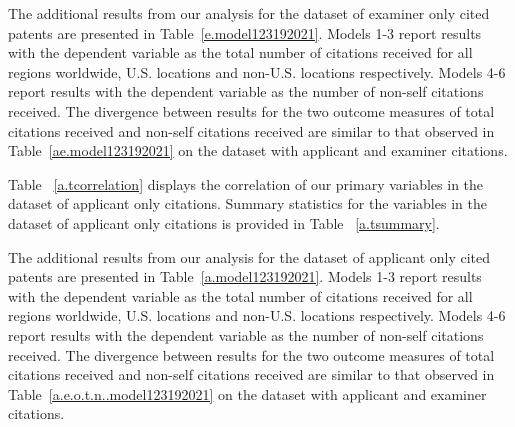\documentclass[12pt,letterpaper]{article}
\begin{document}

%

The additional results from our analysis for the dataset of examiner only cited patents are presented in Table~\ref{e.model123192021}. Models 1-3 report results with the dependent variable as the total number of citations received for all regions worldwide, U.S. locations and non-U.S. locations respectively. Models 4-6 report results with the dependent variable as the number of non-self citations received. The divergence between results for the two outcome measures of total citations received and non-self citations received are similar to that observed in Table~\ref{ae.model123192021} on the dataset with applicant and examiner citations. \par





Table ~\ref{a.tcorrelation} displays the correlation of our primary variables in the dataset of applicant only citations. Summary statistics for the variables in the dataset of applicant only citations is provided in Table ~\ref{a.tsummary}.


%



%

The additional results from our analysis for the dataset of applicant only cited patents are presented in Table~\ref{a.model123192021}. Models 1-3 report results with the dependent variable as the total number of citations received for all regions worldwide, U.S. locations and non-U.S. locations respectively. Models 4-6 report results with the dependent variable as the number of non-self citations received. The divergence between results for the two outcome measures of total citations received and non-self citations received are similar to that observed in Table~\ref{a.e.o.t.n..model123192021} on the dataset with applicant and examiner citations. \par


\end{document}
